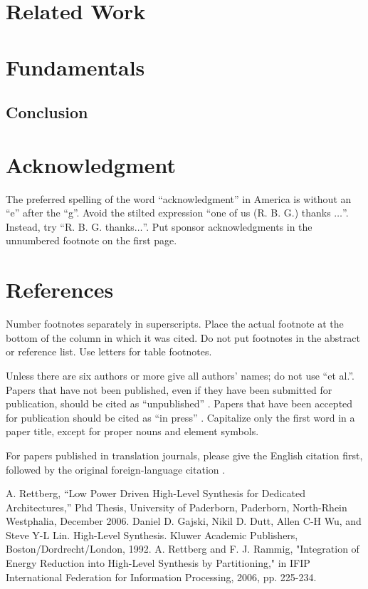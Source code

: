 \documentclass[conference]{IEEEtran}
\begin{document}
\section{Related Work}



\section{Fundamentals}


\subsection{Conclusion}




\section*{Acknowledgment}

The preferred spelling of the word ``acknowledgment'' in America is without 
an ``e'' after the ``g''. Avoid the stilted expression ``one of us (R. B. 
G.) thanks $\ldots$''. Instead, try ``R. B. G. thanks$\ldots$''. Put sponsor 
acknowledgments in the unnumbered footnote on the first page.

\section*{References}


Number footnotes separately in superscripts. Place the actual footnote at 
the bottom of the column in which it was cited. Do not put footnotes in the 
abstract or reference list. Use letters for table footnotes.

Unless there are six authors or more give all authors' names; do not use 
``et al.''. Papers that have not been published, even if they have been 
submitted for publication, should be cited as ``unpublished'' \cite{b4}. Papers 
that have been accepted for publication should be cited as ``in press'' \cite{b5}. 
Capitalize only the first word in a paper title, except for proper nouns and 
element symbols.

For papers published in translation journals, please give the English 
citation first, followed by the original foreign-language citation \cite{b6}.

\begin{thebibliography}{00}
 A. Rettberg, ``Low Power Driven High-Level Synthesis
for Dedicated Architectures,'' Phd Thesis, University of Paderborn, Paderborn, North-Rhein Westphalia, December 2006.
 Daniel D. Gajski, Nikil D. Dutt, Allen C-H Wu, and Steve Y-L Lin. High-Level Synthesis. Kluwer Academic Publishers, Boston/Dordrecht/London, 1992.
 A. Rettberg and F. J. Rammig, "Integration of Energy Reduction into High-Level Synthesis by Partitioning," in IFIP International Federation for Information Processing, 2006, pp. 225-234. 
\end{thebibliography}
\vspace{12pt}
\color{red}
\end{document}
